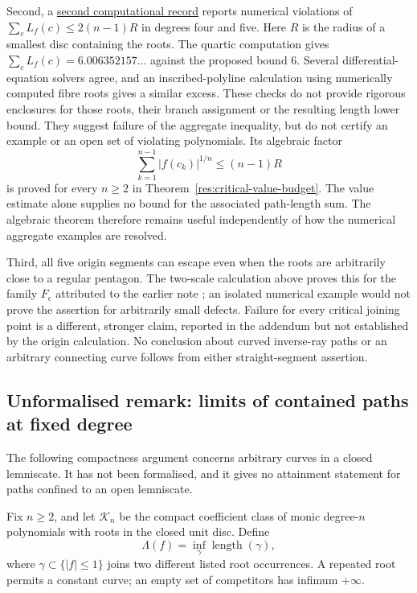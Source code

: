 \documentclass[11pt]{article}
\begin{document}
Second, a
\href{https://github.com/wcook04/plectis-erdos/blob/f214a6b45528dc5eefe20ffadc35f2e981627d4c/research_corpus/Erdos1041/SeparatrixAggregateReduction.md}{second computational record}
reports numerical violations of
$\sum_cL_f(c)\le2(n-1)R$ in degrees four and five. Here $R$ is the radius of
a smallest disc containing the roots. The quartic computation gives
$\sum_cL_f(c)=6.006352157\ldots$ against the proposed bound $6$.
Several differential-equation solvers agree, and an inscribed-polyline
calculation using numerically computed fibre roots gives a similar excess.
These checks do not provide rigorous enclosures for those roots, their
branch assignment or the resulting length lower bound. They suggest failure of the aggregate inequality, but do not certify
an example or an open set of violating polynomials. Its algebraic factor
\[
 \sum_{k=1}^{n-1}|f(c_k)|^{1/n}\le(n-1)R
\]
is proved for every $n\ge2$ in Theorem~\ref{res:critical-value-budget}.
The value estimate alone supplies no bound for the associated path-length
sum. The algebraic theorem therefore remains useful independently of how
the numerical aggregate examples are resolved.

Third, all five origin segments can escape even when the roots are
arbitrarily close to a regular pentagon. The two-scale calculation above
proves this for the family $F_\epsilon$ attributed to the earlier note
\cite[Proposition~A of the earlier note]{revision2026}; an
isolated numerical example would not prove the assertion for arbitrarily
small defects. Failure for every critical joining point is a different,
stronger claim, reported in the addendum but not established by the
origin calculation. No conclusion about curved inverse-ray paths or an
arbitrary connecting curve follows from either straight-segment assertion.

\subsection*{Unformalised remark: limits of contained paths at fixed degree}
\hypertarget{closed-class-limits}{}
The following compactness argument concerns arbitrary
curves in a closed lemniscate. It has
not been formalised, and it gives no attainment statement for paths
confined to an open lemniscate.

Fix $n\ge2$, and let $\mathcal K_n$ be the compact coefficient class of
monic degree-$n$ polynomials with roots in the closed unit disc.  Define
\[
 \Lambda(f)=\inf_\gamma\operatorname{length}(\gamma),
\]
where $\gamma\subset\{|f|\le1\}$ joins two different listed root
occurrences. A repeated root permits a constant curve; an empty set of
competitors has infimum $+\infty$.
\end{document}
